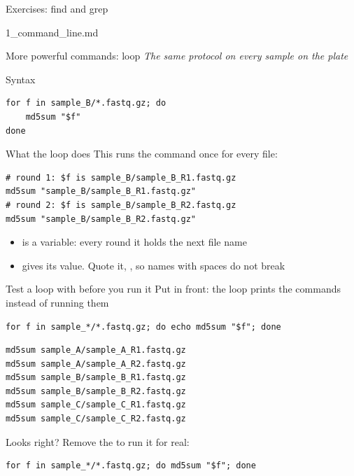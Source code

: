 \begin{frame}{Exercises: find and grep}
\begin{exlist}{1_command_line.md}
\end{exlist}
\end{frame}

\begin{frame}[fragile]{More powerful commands:  loop}
\emph{The same protocol on every sample on the plate}
\begin{block}{Syntax}
\end{block}
\begin{lstlisting}
for f in sample_B/*.fastq.gz; do
    md5sum "$f"
done
\end{lstlisting}
\end{frame}

\begin{frame}[fragile]{What the  loop does}
This runs the command once for every file:
\begin{lstlisting}
# round 1: $f is sample_B/sample_B_R1.fastq.gz
md5sum "sample_B/sample_B_R1.fastq.gz"
# round 2: $f is sample_B/sample_B_R2.fastq.gz
md5sum "sample_B/sample_B_R2.fastq.gz"
\end{lstlisting}
\bigskip
\begin{itemize}
    \item {} is a variable: every round it holds the next file name
    \item {} gives its value.
          Quote it, , so names with spaces do not break
\end{itemize}
\end{frame}

\begin{frame}[fragile]{Test a loop with  before you run it}
Put  in front: the loop prints the commands instead of running them
\begin{lstlisting}
for f in sample_*/*.fastq.gz; do echo md5sum "$f"; done
\end{lstlisting}
\pause
\begin{lstlisting}[style=output]
md5sum sample_A/sample_A_R1.fastq.gz
md5sum sample_A/sample_A_R2.fastq.gz
md5sum sample_B/sample_B_R1.fastq.gz
md5sum sample_B/sample_B_R2.fastq.gz
md5sum sample_C/sample_C_R1.fastq.gz
md5sum sample_C/sample_C_R2.fastq.gz
\end{lstlisting}
\pause
Looks right?
Remove the  to run it for real:
\begin{lstlisting}
for f in sample_*/*.fastq.gz; do md5sum "$f"; done
\end{lstlisting}
\end{frame}

